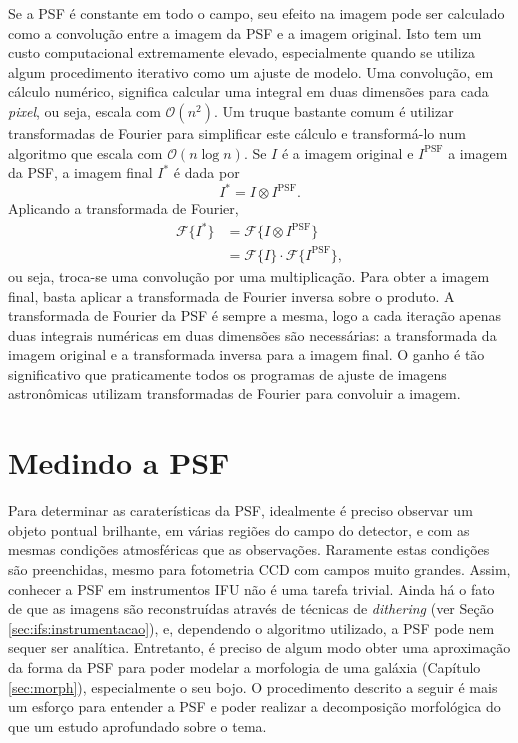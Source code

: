 Se a PSF é constante em todo o campo, seu efeito na imagem pode ser calculado
como a convolução entre a imagem da PSF e a imagem original. Isto tem um custo
computacional extremamente elevado, especialmente quando se utiliza algum
procedimento iterativo como um ajuste de modelo. Uma convolução, em cálculo
numérico, significa calcular uma integral em duas dimensões para cada {\em
pixel}, ou seja, escala com $\mathcal{O}(n^2)$. Um truque bastante comum é
utilizar transformadas de Fourier para simplificar este cálculo e transformá-lo
num algoritmo que escala com $\mathcal{O}(n \log n)$. Se $I$ é a imagem original
e $I^\mathrm{PSF}$ a imagem da PSF, a imagem final $I^\ast$ é dada por
\begin{equation*}
I^\ast = I \otimes I^\mathrm{PSF}.
\end{equation*}
Aplicando a transformada de Fourier,
\begin{align*}
\mathcal{F}\{I^\ast\} &= \mathcal{F}\{I \otimes
I^\mathrm{PSF}\} \\
&= \mathcal{F}\{I\} \cdot \mathcal{F}\{I^\mathrm{PSF}\},
\end{align*}
ou seja, troca-se uma convolução por uma multiplicação. Para obter a imagem
final, basta aplicar a transformada de Fourier inversa sobre o produto. A
transformada de Fourier da PSF é sempre a mesma, logo a cada iteração apenas
duas integrais numéricas em duas dimensões são necessárias: a transformada da
imagem original e a transformada inversa para a imagem final. O ganho é tão
significativo que praticamente todos os programas de ajuste de imagens
astronômicas utilizam transformadas de Fourier para convoluir a imagem.


\section{Medindo a PSF}
\label{sec:psf:medida}

Para determinar as caraterísticas da PSF, idealmente é preciso observar um
objeto pontual brilhante, em várias regiões do campo do detector, e com as
mesmas condições atmosféricas que as observações. Raramente estas condições são
preenchidas, mesmo para fotometria CCD com campos muito grandes. Assim, conhecer
a PSF em instrumentos IFU não é uma tarefa trivial. Ainda há o fato de que as
imagens são reconstruídas através de técnicas de {\em dithering} (ver Seção
\ref{sec:ifs:instrumentacao}), e, dependendo o algoritmo utilizado, a PSF pode
nem sequer ser analítica. Entretanto, é preciso de algum modo obter uma
aproximação da forma da PSF para poder modelar a morfologia de uma galáxia
(Capítulo \ref{sec:morph}), especialmente o seu bojo. O procedimento descrito a
seguir é mais um esforço para entender a PSF e poder realizar a decomposição
morfológica do que um estudo aprofundado sobre o tema.

